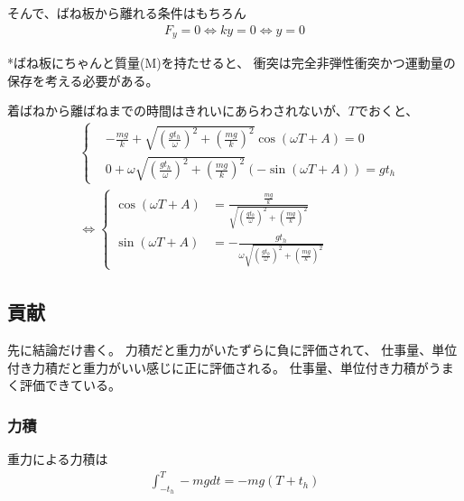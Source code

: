 \documentclass[a4paper,11pt]{jsarticle}
\begin{document}
そんで、ばね板から離れる条件はもちろん
\begin{align}
  F_y = 0 \Leftrightarrow ky = 0 \Leftrightarrow y = 0
\end{align}

*ばね板にちゃんと質量(M)を持たせると、
衝突は完全非弾性衝突かつ運動量の保存を考える必要がある。

着ばねから離ばねまでの時間はきれいにあらわされないが、$T$でおくと、
\begin{align}
   & \begin{cases}
        & -\frac{mg}{k} + \sqrt{\left(\frac{gt_h}{\omega}\right)^2 + \left(\frac{mg}{k}\right)^2} \cos \left( \omega T + A \right) = 0
       \\& 0 + \omega \sqrt{\left(\frac{gt_h}{\omega}\right)^2 + \left(\frac{mg}{k}\right)^2} \left( - \sin \left( \omega T + A \right) \right) = gt_h
     \end{cases}
  \\& \Leftrightarrow
  \begin{cases}
    \cos \left( \omega T + A \right) & = \frac{ \frac{mg}{k} }{ \sqrt{\left(\frac{gt_h}{\omega}\right)^2 + \left(\frac{mg}{k}\right)^2} }
    \\ \sin \left( \omega T + A \right) &= - \frac{gt_h}{ \omega \sqrt{\left(\frac{gt_h}{\omega}\right)^2 + \left(\frac{mg}{k}\right)^2} }
  \end{cases}
\end{align}

\subsection{貢献}
先に結論だけ書く。
力積だと重力がいたずらに負に評価されて、
仕事量、単位付き力積だと重力がいい感じに正に評価される。
仕事量、単位付き力積がうまく評価できている。
\subsubsection{力積}
重力による力積は
\begin{align}
  \int_{-t_h}^{T} -mg dt = -mg \left(T + t_h\right)
\end{align}
\end{document}
